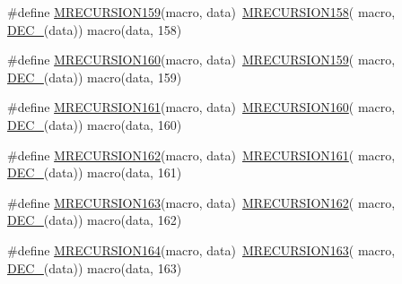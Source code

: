\begin{DoxyCompactItemize}
\item 
\#define \mbox{\hyperlink{group__group__sam0__utils__mrecursion_gaaef0c4232ced8fccec8764fc981ef985}{M\+R\+E\+C\+U\+R\+S\+I\+O\+N159}}(macro,  data)~\mbox{\hyperlink{group__group__sam0__utils__mrecursion_ga90de60faf1fb23d6aa01aaccbe3b4e79}{M\+R\+E\+C\+U\+R\+S\+I\+O\+N158}}(  macro, \mbox{\hyperlink{group__group__sam0__utils__mrecursion_ga1d23d683797679dca8c3512a54a5dcae}{D\+E\+C\+\_\+}}(data))   macro(data, 158)
\item 
\#define \mbox{\hyperlink{group__group__sam0__utils__mrecursion_ga89acda6db52162017b6af2601a8ec0d4}{M\+R\+E\+C\+U\+R\+S\+I\+O\+N160}}(macro,  data)~\mbox{\hyperlink{group__group__sam0__utils__mrecursion_gaaef0c4232ced8fccec8764fc981ef985}{M\+R\+E\+C\+U\+R\+S\+I\+O\+N159}}(  macro, \mbox{\hyperlink{group__group__sam0__utils__mrecursion_ga1d23d683797679dca8c3512a54a5dcae}{D\+E\+C\+\_\+}}(data))   macro(data, 159)
\item 
\#define \mbox{\hyperlink{group__group__sam0__utils__mrecursion_ga00b14059593a449a083e403139ea228b}{M\+R\+E\+C\+U\+R\+S\+I\+O\+N161}}(macro,  data)~\mbox{\hyperlink{group__group__sam0__utils__mrecursion_ga89acda6db52162017b6af2601a8ec0d4}{M\+R\+E\+C\+U\+R\+S\+I\+O\+N160}}(  macro, \mbox{\hyperlink{group__group__sam0__utils__mrecursion_ga1d23d683797679dca8c3512a54a5dcae}{D\+E\+C\+\_\+}}(data))   macro(data, 160)
\item 
\#define \mbox{\hyperlink{group__group__sam0__utils__mrecursion_ga6c3b057c06e8d93ffdf5c7fdb105ede2}{M\+R\+E\+C\+U\+R\+S\+I\+O\+N162}}(macro,  data)~\mbox{\hyperlink{group__group__sam0__utils__mrecursion_ga00b14059593a449a083e403139ea228b}{M\+R\+E\+C\+U\+R\+S\+I\+O\+N161}}(  macro, \mbox{\hyperlink{group__group__sam0__utils__mrecursion_ga1d23d683797679dca8c3512a54a5dcae}{D\+E\+C\+\_\+}}(data))   macro(data, 161)
\item 
\#define \mbox{\hyperlink{group__group__sam0__utils__mrecursion_ga9afa4ec669818640ed94de0404f0e982}{M\+R\+E\+C\+U\+R\+S\+I\+O\+N163}}(macro,  data)~\mbox{\hyperlink{group__group__sam0__utils__mrecursion_ga6c3b057c06e8d93ffdf5c7fdb105ede2}{M\+R\+E\+C\+U\+R\+S\+I\+O\+N162}}(  macro, \mbox{\hyperlink{group__group__sam0__utils__mrecursion_ga1d23d683797679dca8c3512a54a5dcae}{D\+E\+C\+\_\+}}(data))   macro(data, 162)
\item 
\#define \mbox{\hyperlink{group__group__sam0__utils__mrecursion_gaca0807249e00f403e7a8af24aae6e921}{M\+R\+E\+C\+U\+R\+S\+I\+O\+N164}}(macro,  data)~\mbox{\hyperlink{group__group__sam0__utils__mrecursion_ga9afa4ec669818640ed94de0404f0e982}{M\+R\+E\+C\+U\+R\+S\+I\+O\+N163}}(  macro, \mbox{\hyperlink{group__group__sam0__utils__mrecursion_ga1d23d683797679dca8c3512a54a5dcae}{D\+E\+C\+\_\+}}(data))   macro(data, 163)

\end{DoxyCompactItemize}
